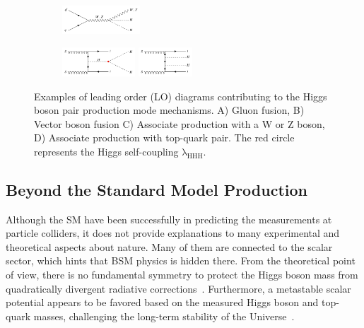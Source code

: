 \begin{figure}[ht]
\begin{subfigure}{\textwidth}
\includegraphics[width=0.32\textwidth]{Figures/HiggsPairProduction/vhh3.png}\\
      \end{subfigure}
      \begin{subfigure}{\textwidth}
  \centering
          \caption{}
\includegraphics[width=0.30\textwidth]{Figures/HiggsPairProduction/tthh1.png}
\includegraphics[width=0.22\textwidth]{Figures/HiggsPairProduction/tthh2.png}\\
      \end{subfigure}
\caption[Examples of leading order (LO) diagrams contributing to the Higgs boson pair production mode mechanisms]{Examples of leading order (LO) diagrams contributing to the Higgs boson pair production mode mechanisms. A) Gluon fusion, B) Vector boson fusion C) Associate production with a W or Z boson, D) Associate production with top-quark pair. The red circle represents the Higgs self-coupling $\mathrm{\lambda_{HHH}}$.}
\label{fig:hhdiagrams}
\end{figure}

\subsection{Beyond the Standard Model Production} \label{hh:BSMcouplings}
Although the SM have been successfully in predicting the measurements at particle colliders, it does not provide explanations to many experimental and theoretical aspects about nature. Many of them are connected to the scalar sector, which hints that BSM physics is hidden there. From the theoretical point of view, there is no fundamental symmetry to protect the Higgs boson mass from quadratically divergent radiative corrections~\cite{pdg}. Furthermore, a metastable scalar potential appears to be favored based on the measured Higgs boson and top-quark masses, challenging the long-term stability of the Universe~\cite{Elias-Miro:2011sqh}.

